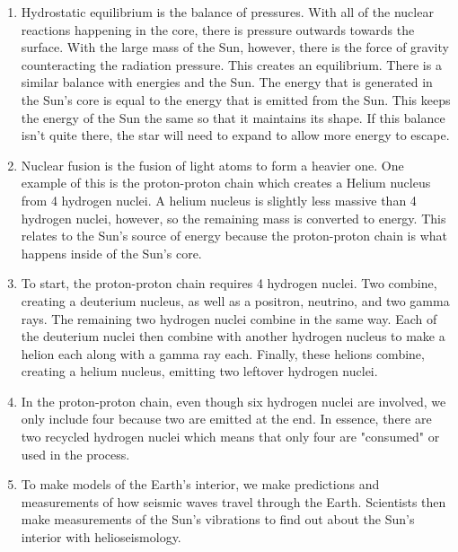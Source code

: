 \documentclass[../hw2.tex]{subfiles}
\begin{document}
    \begin{enumerate}
        \item Hydrostatic equilibrium is the balance of pressures. With all of the nuclear reactions happening in the core, there is pressure outwards towards the surface. With the large mass of the Sun, however, there is the force of gravity counteracting the radiation pressure. This creates an equilibrium. There is a similar balance with energies and the Sun. The energy that is generated in the Sun's core is equal to the energy that is emitted from the Sun. This keeps the energy of the Sun the same so that it maintains its shape. If this balance isn't quite there, the star will need to expand to allow more energy to escape.
        \item Nuclear fusion is the fusion of light atoms to form a heavier one. One example of this is the proton-proton chain which creates a Helium nucleus from 4 hydrogen nuclei. A helium nucleus is slightly less massive than 4 hydrogen nuclei, however, so the remaining mass is converted to energy. This relates to the Sun's source of energy because the proton-proton chain is what happens inside of the Sun's core.
        \item To start, the proton-proton chain requires 4 hydrogen nuclei. Two combine, creating a deuterium nucleus, as well as a positron, neutrino, and two gamma rays. The remaining two hydrogen nuclei combine in the same way. Each of the deuterium nuclei then combine with another hydrogen nucleus to make a helion each along with a gamma ray each. Finally, these helions combine, creating a helium nucleus, emitting two leftover hydrogen nuclei.
        \item In the proton-proton chain, even though six hydrogen nuclei are involved, we only include four because two are emitted at the end. In essence, there are two recycled hydrogen nuclei which means that only four are "consumed" or used in the process.
        \item To make models of the Earth's interior, we make predictions and measurements of how seismic waves travel through the Earth. Scientists then make measurements of the Sun's vibrations to find out about the Sun's interior with helioseismology.
    \end{enumerate}
\end{document}
